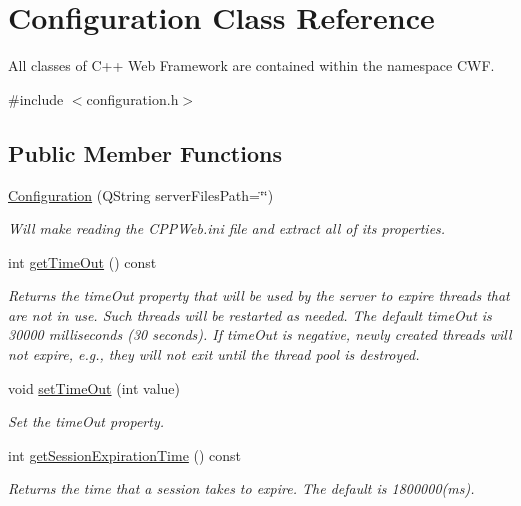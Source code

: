 \hypertarget{class_configuration}{}\section{Configuration Class Reference}
\label{class_configuration}


All classes of C++ Web Framework are contained within the namespace C\+WF.  




{\ttfamily \#include $<$configuration.\+h$>$}

\subsection*{Public Member Functions}
\begin{DoxyCompactItemize}
\item 
\hyperlink{class_configuration_af5d72b2e949b80b291b1013268cff405}{Configuration} (Q\+String server\+Files\+Path=\char`\"{}\char`\"{})
\begin{DoxyCompactList}\small\item\em Will make reading the C\+P\+P\+Web.\+ini file and extract all of its properties. \end{DoxyCompactList}\item 
int \hyperlink{class_configuration_a3cd126ebe20117c04b4d38797e06551d}{get\+Time\+Out} () const
\begin{DoxyCompactList}\small\item\em Returns the time\+Out property that will be used by the server to expire threads that are not in use. Such threads will be restarted as needed. The default time\+Out is 30000 milliseconds (30 seconds). If time\+Out is negative, newly created threads will not expire, e.\+g., they will not exit until the thread pool is destroyed. \end{DoxyCompactList}\item 
void \hyperlink{class_configuration_a4fc1c685775b37e7b553c3393f1b2998}{set\+Time\+Out} (int value)
\begin{DoxyCompactList}\small\item\em Set the time\+Out property. \end{DoxyCompactList}\item 
int \hyperlink{class_configuration_af14b4f22fdcdfc32fbcac712a9868fd4}{get\+Session\+Expiration\+Time} () const
\begin{DoxyCompactList}\small\item\em Returns the time that a session takes to expire. The default is 1800000(ms). \end{DoxyCompactList}\item 

\end{DoxyCompactItemize}
